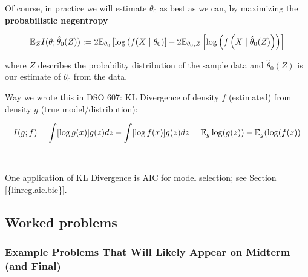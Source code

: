 Of course, in practice we will estimate \(\theta_0\) as best as we can, by maximizing the \textbf{probabilistic negentropy}

\[
\E_Z I(\theta; \hat{\theta}_0(Z)) := 2\E_{\theta_0} \left[ \log \left( f(X \mid \theta_0 \right) \right] - 2 \E_{\theta_0, Z} \left[ \log \left( f \left(X \mid \hat{\theta}_0(Z) \right) \right) \right]
\]

where \(Z\) describes the probability distribution of the sample data and \(\hat{\theta}_0(Z)\) is our estimate of \(\theta_0\) from the data.

Way we wrote this in DSO 607: KL Divergence of density \(f\) (estimated) from density \(g\) (true model/distribution):

\[
I(g; f) = \int[\log g(x) ] g(z) dz - \int [\log f(x)] g(z) dz = \E_g \log(g(z)) - \E_g(\log(f(z))
\]



\

One application of KL Divergence is AIC for model selection; see Section \ref{{linreg.aic.bic}}.

%
%
%
%
%
%
%
\subsection{Worked problems}

\subsubsection{Example Problems That Will Likely Appear on Midterm (and Final)}

%
%
%
%
%
%
%
%

